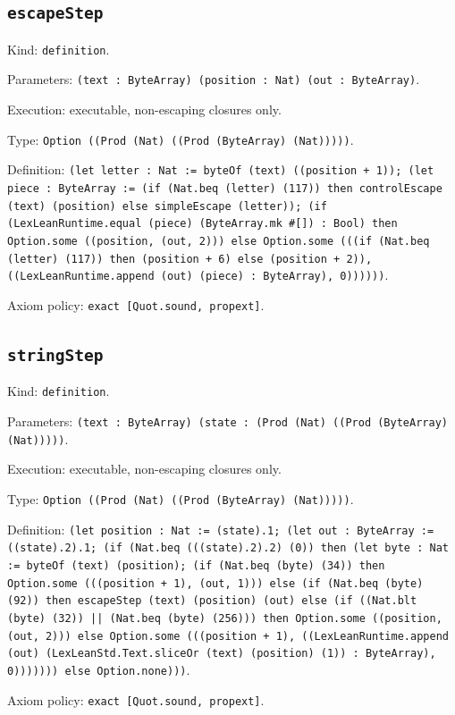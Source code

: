\documentclass[11pt]{article}
\begin{document}
\subsection*{\texttt{escapeStep}}
\noindent Kind: \texttt{definition}.\par
\noindent Parameters: \texttt{(text : ByteArray) (position : Nat) (out : ByteArray)}.\par
\noindent Execution: executable, non-escaping closures only.\par
\noindent Type: \texttt{Option ((Prod (Nat) ((Prod (ByteArray) (Nat)))))}.\par
\noindent Definition: \texttt{(let letter : Nat := byteOf (text) ((position + 1)); (let piece : ByteArray := (if (Nat.beq (letter) (117)) then controlEscape (text) (position) else simpleEscape (letter)); (if (LexLeanRuntime.equal (piece) (ByteArray.mk \#[]) : Bool) then Option.some ((position, (out, 2))) else Option.some (((if (Nat.beq (letter) (117)) then (position + 6) else (position + 2)), ((LexLeanRuntime.append (out) (piece) : ByteArray), 0))))))}.\par
\noindent Axiom policy: \texttt{exact [Quot.sound, propext]}.\par
\subsection*{\texttt{stringStep}}
\noindent Kind: \texttt{definition}.\par
\noindent Parameters: \texttt{(text : ByteArray) (state : (Prod (Nat) ((Prod (ByteArray) (Nat)))))}.\par
\noindent Execution: executable, non-escaping closures only.\par
\noindent Type: \texttt{Option ((Prod (Nat) ((Prod (ByteArray) (Nat)))))}.\par
\noindent Definition: \texttt{(let position : Nat := (state).1; (let out : ByteArray := ((state).2).1; (if (Nat.beq (((state).2).2) (0)) then (let byte : Nat := byteOf (text) (position); (if (Nat.beq (byte) (34)) then Option.some (((position + 1), (out, 1))) else (if (Nat.beq (byte) (92)) then escapeStep (text) (position) (out) else (if ((Nat.blt (byte) (32)) || (Nat.beq (byte) (256))) then Option.some ((position, (out, 2))) else Option.some (((position + 1), ((LexLeanRuntime.append (out) (LexLeanStd.Text.sliceOr (text) (position) (1)) : ByteArray), 0))))))) else Option.none)))}.\par
\noindent Axiom policy: \texttt{exact [Quot.sound, propext]}.\par
\end{document}
